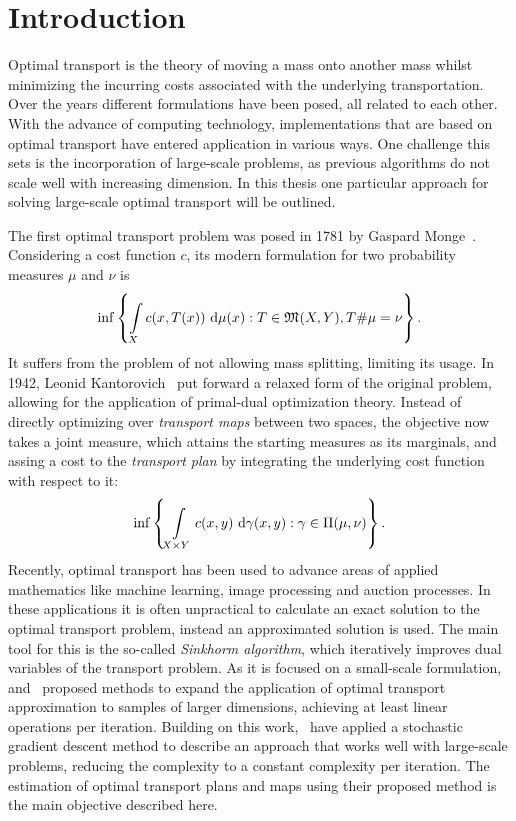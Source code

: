 \chapter*{Introduction}

Optimal transport is the theory of moving a mass onto another mass whilst minimizing the incurring costs associated with the underlying transportation. Over the years different formulations have been posed, all related to each other. With the advance of computing technology, implementations that are based on optimal transport have entered application in various ways. One challenge this sets is the incorporation of large-scale problems, as previous algorithms do not scale well with increasing dimension. In this thesis one particular approach for solving large-scale optimal transport will be outlined.

The first optimal transport problem was posed in 1781 by Gaspard Monge\ \cite{Mon1781}. Considering a cost function $c$, its modern formulation for two probability measures $\mu$ and $\nu$ is
\[ \inf \left\{ \int\limits_X c(x, T(x))~\Dx{\mu} : T \in \MF{X}{Y}, \push{\mu} = \nu \right\}. \]
It suffers from the problem of not allowing mass splitting, limiting its usage. In 1942, Leonid Kantorovich\ \cite{Kan1942} put forward a relaxed form of the original problem, allowing for the application of primal-dual optimization theory. Instead of directly optimizing over \textit{transport maps} between two spaces, the objective now takes a joint measure, which attains the starting measures as its marginals, and assing a cost to the \textit{transport plan} by integrating the underlying cost function with respect to it:
\[ \inf \left\{ \int\limits_{X \times Y} c(x, y)~\Dx[x, y]{\gamma} : \gamma \in \TP{\mu}{\nu} \right\}. \]
Recently, optimal transport has been used to advance areas of applied mathematics like machine learning, image processing and auction processes. In these applications it is often unpractical to calculate an exact solution to the optimal transport problem, instead an approximated solution is used. The main tool for this is the so-called \textit{Sinkhorm algorithm}, which iteratively improves dual variables of the transport problem. As it is focused on a small-scale formulation,\ \cite{Gene2016} and\ \cite{Arjo2017} proposed methods to expand the application of optimal transport approximation to samples of larger dimensions, achieving at least linear operations per iteration. Building on this work,\ \cite{Seg2018} have applied a stochastic gradient descent method to describe an approach that works well with large-scale problems, reducing the complexity to a constant complexity per iteration. The estimation of optimal transport plans and maps using their proposed method is the main objective described here.

